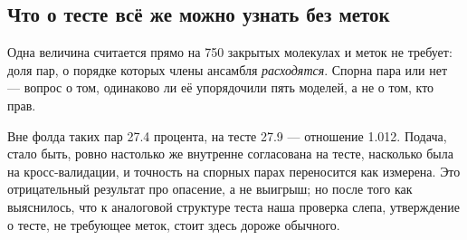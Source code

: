 \subsection{Что о тесте всё же можно узнать без меток}

Одна величина считается прямо на 750 закрытых молекулах и меток не требует: доля пар, о порядке которых
члены ансамбля \emph{расходятся}. Спорна пара или нет --- вопрос о том, одинаково ли её упорядочили
пять моделей, а не о том, кто прав.

Вне фолда таких пар 27.4 процента, на тесте 27.9 --- отношение 1.012. Подача, стало быть, ровно
настолько же внутренне согласована на тесте, насколько была на кросс-валидации, и точность на спорных
парах переносится как измерена. Это отрицательный результат про опасение, а не выигрыш; но после того
как выяснилось, что к аналоговой структуре теста наша проверка слепа, утверждение о тесте, не
требующее меток, стоит здесь дороже обычного.
